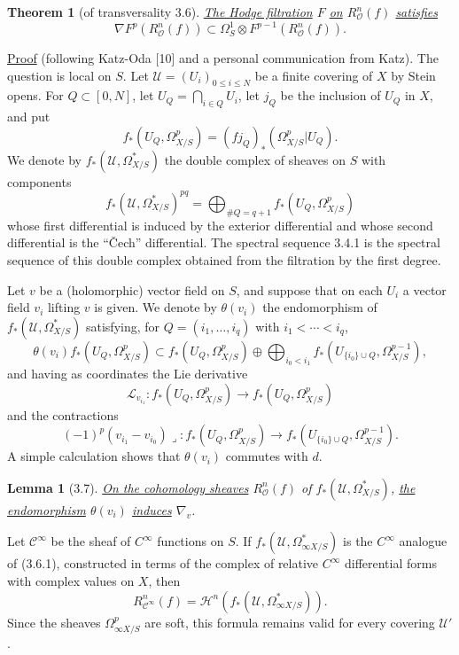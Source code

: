\documentclass[10pt,leqno]{article}
\newcommand{\cO}{\mathcal O}
\newcommand{\cU}{\mathcal U}
\newcommand{\cC}{\mathcal C}
\theoremstyle{deligne}
\newtheorem*{theorem}{Theorem}
\newtheorem*{lemma}{Lemma}
\renewcommand{\underline}[1]{\uline{#1}}
\begin{document}
\begin{theorem}[of transversality 3.6]
\underline{The Hodge filtration} $F$ \underline{on} $R_\cO^n(f)$ \underline{satisfies}
\[
\nabla F^p(R_\cO^n(f))\subset \Omega_S^1\otimes F^{p-1}(R_\cO^n(f)).
\]
\end{theorem}

\underline{Proof} (following Katz-Oda [10] and a personal communication from Katz). The question is local on $S$. Let $\cU=(U_i)_{0\le i\le N}$ be a finite covering of $X$ by Stein opens. For $Q\subset[0,N]$, let $U_Q=\bigcap_{i\in Q}U_i$, let $j_Q$ be the inclusion of $U_Q$ in $X$, and put
\[
f_*(U_Q,\Omega^p_{X/S})=(fj_Q)_*(\Omega^p_{X/S}|U_Q).
\]
We denote by $f_*(\cU,\Omega^*_{X/S})$ the double complex of sheaves on $S$ with components
\begin{equation}
f_*(\cU,\Omega^*_{X/S})^{pq}=\bigoplus_{\#Q=q+1} f_*(U_Q,\Omega^p_{X/S})
\tag{3.6.1}
\end{equation}
whose first differential is induced by the exterior differential and whose second differential is the ``Čech'' differential. The spectral sequence 3.4.1 is the spectral sequence of this double complex obtained from the filtration by the first degree.

Let $v$ be a (holomorphic) vector field on $S$, and suppose that on each $U_i$ a vector field $v_i$ lifting $v$ is given. We denote by $\theta(v_i)$ the endomorphism of $f_*(\cU,\Omega^*_{X/S})$ satisfying, for $Q=(i_1,\ldots,i_q)$ with $i_1<\cdots<i_q$,
\[
\theta(v_i) f_*(U_Q,\Omega^p_{X/S})
\subset
f_*(U_Q,\Omega^p_{X/S})
\oplus
\bigoplus_{i_0<i_1} f_*(U_{\{i_0\}\cup Q},\Omega^{p-1}_{X/S}),
\]
and having as coordinates the Lie derivative
\[
\mathcal L_{v_{i_1}}:f_*(U_Q,\Omega^p_{X/S})\longrightarrow f_*(U_Q,\Omega^p_{X/S})
\]
and the contractions
\[
(-1)^p(v_{i_1}-v_{i_0})\lrcorner:
 f_*(U_Q,\Omega^p_{X/S})\longrightarrow f_*(U_{\{i_0\}\cup Q},\Omega^{p-1}_{X/S}).
\]
A simple calculation shows that $\theta(v_i)$ commutes with $d$.

\begin{lemma}[3.7]
\underline{On the cohomology sheaves} $R_\cO^n(f)$ of $f_*(\cU,\Omega^*_{X/S})$, \underline{the endomorphism} $\theta(v_i)$ \underline{induces} $\nabla_v$.
\end{lemma}

Let $\cC^\infty$ be the sheaf of $C^\infty$ functions on $S$. If $f_*(\cU,\Omega^*_{\infty X/S})$ is the $C^\infty$ analogue of (3.6.1), constructed in terms of the complex of relative $C^\infty$ differential forms with complex values on $X$, then
\[
R_{\cC^\infty}^n(f)=\mathcal H^n(f_*(\cU,\Omega^*_{\infty X/S})).
\]
Since the sheaves $\Omega^p_{\infty X/S}$ are soft, this formula remains valid for every covering $\cU'$.
\end{document}
